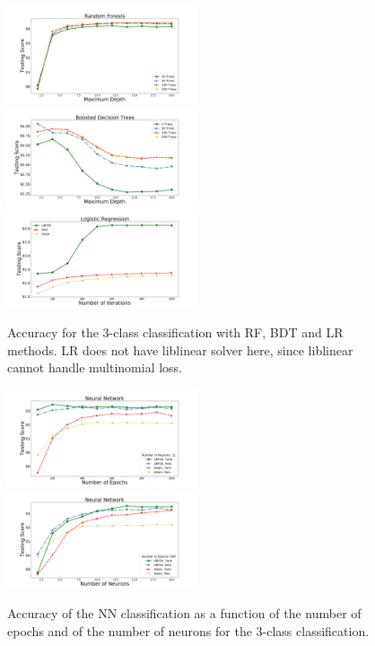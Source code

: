 \begin{figure}[h]
\center
\includegraphics[width=0.5\textwidth]{plots/rf_train_multi.pdf}\\
\includegraphics[width=0.5\textwidth]{plots/bdt_train_multi.pdf}
\includegraphics[width=0.5\textwidth]{plots/lr_train_multi.pdf}
\caption{Accuracy for the 3-class classification with RF, BDT and LR  methods. LR does not have liblinear solver here, since liblinear cannot handle multinomial loss.
}
\label{fig:tree_multi}
\end{figure}

\begin{figure}[h]
\center
\includegraphics[width=0.5\textwidth]{plots/nn_epoch_train_multi.pdf}\\
\includegraphics[width=0.5\textwidth]{plots/nn_neuron_train_multi.pdf}
\caption{Accuracy of the NN classification as a function of the number of epochs and of the number of neurons
 for the 3-class classification. 
 }
\label{fig:nets_multi}
\end{figure}


